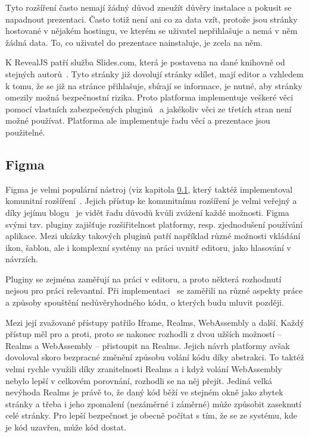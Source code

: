 Tyto rozšíření často nemají žádný důvod zneužít důvěry instalace a pokusit se napadnout prezentaci.
Často totiž není ani co za data vzít, protože jsou stránky hostované v nějakém hostingu, ve kterém se uživatel nepřihlašuje a nemá v něm žádná data.
To, co uživatel do prezentace nainstaluje, je zcela na něm.

K RevealJS patří služba Slides.com, která je postavena na dané knihovně od stejných autorů~\cite{slidescom}.
Tyto stránky již dovolují stránky sdílet, mají editor a vzhledem k tomu, že se již na stránce přihlašuje, sbírají se informace, je nutné, aby stránky omezily možná bezpečnostní rizika.
Proto platforma implementuje veškeré věci pomocí vlastních zabezpečených pluginů~\cite{slidescom} a jakékoliv věci ze třetích stran není možné používat.
Platforma ale implementuje řadu věcí a prezentace jsou použitelné.

\subsection{Figma}\label{text:figma}

Figma je velmi populární nástroj (viz kapitola \ref{text:figma}, který taktéž implementoval komunitní rozšíření~\cite{figma_website}.
Jejich přístup ke komunitnímu rozšíření je velmi veřejný a díky jejímu blogu~\cite{figma_plugins_blog} je vidět řadu důvodů kvůli zvážení každé možnosti.
Figma svými tzv. pluginy zajišťuje rozšiřitelnost platformy, resp. zjednodušení používání aplikace.
Mezi ukázky takových pluginů patří například různé možnosti vkládání ikon, šablon, ale i komplexní systémy na práci uvnitř editoru, jako hlasování v návrzích.

Pluginy se zejména zaměřují na práci v editoru, a proto některá rozhodnutí nejsou pro práci relevantní.
Při implementaci~\cite{figma_plugins_blog} se zaměřili na různé aspekty práce a způsoby spouštění nedůvěryhodného kódu, o kterých budu mluvit později.

Mezi její zvažované přístupy patřilo Iframe, Realms, WebAssembly a další.
Každý přístup měl pro a proti, proto se nakonec rozhodli z dvou užších možností -- Realms a WebAssembly -- přistoupit na Realms.
Jejich návrh platformy avšak dovoloval skoro bezpracné změnění způsobu volání kódu díky abstrakci.
To taktéž velmi rychle využili díky zranitelnosti Realms a i když volání WebAssembly nebylo lepší v celkovém porovnání, rozhodli se na něj přejít.
Jediná velká nevýhoda Realms je právě to, že daný kód běží ve stejném okně jako zbytek stránky a třeba i jeho zpomalení (nezáměrné i záměrné) může způsobit zaseknutí celé stránky.
Pro lepší bezpečnost je obecně počítat s tím, že se ze systému, kde je kód uzavřen, může kód dostat.

